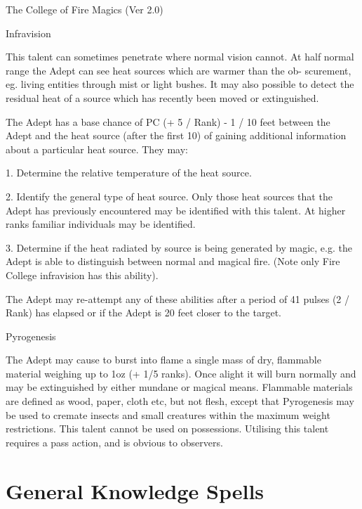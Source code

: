 \begin{Chapter}{The College of Fire Magics (Ver 2.0)}
\begin{talent}[T-1]{Infravision}
\begin{effects}
This talent can sometimes penetrate where normal vision cannot. At
half normal range the Adept can see heat sources which are warmer than
the ob- scurement, eg.  living entities through mist or light bushes.
It may also possible to detect the residual heat of a source which has
recently been moved or extinguished.

The Adept has a base chance of PC (+ 5 / Rank) - 1 / 10 feet between
the Adept and the heat source (after the first 10) of gaining
additional information about a particular heat source. They may:

1. Determine the relative temperature of the heat source.

2. Identify the general type of heat source.  Only those heat sources
that the Adept has previously encountered may be identified with this
talent.  At higher ranks familiar individuals may be identified.

3. Determine if the heat radiated by source is being generated by
magic, e.g.  the Adept is able to distinguish between normal and
magical fire.  (Note only Fire College infravision has this ability).

The Adept may re-attempt any of these abilities after a period of 41
pulses (2 / Rank) has elapsed or if the Adept is 20 feet closer to the
target.
\end{effects}
\end{talent}

\begin{talent}[T-2]{Pyrogenesis}

\begin{effects}
The Adept may cause to burst into flame a single mass of dry,
flammable material weighing up to 1oz (+ 1/5 ranks). Once alight it
will burn normally and may be extinguished by either mundane or
magical means.  Flammable materials are defined as wood, paper, cloth
etc, but not flesh, except that Pyrogenesis may be used to cremate
insects and small creatures within the maximum weight restrictions.
This talent cannot be used on possessions. Utilising this talent
requires a pass action, and is obvious to observers.
\end{effects}
\end{talent}

\section{General Knowledge Spells}


\end{Chapter}
